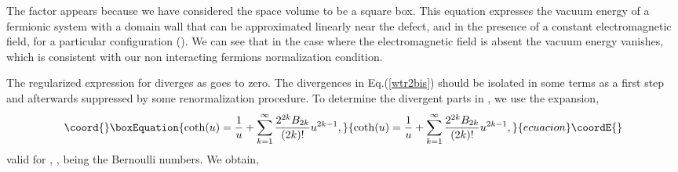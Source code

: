 \documentclass[a4paper,12pt]{article}
\providecommand{\Fd}{\widetilde{F}}
\providecommand{\n}{\eta}
\begin{document}
The \coordHE{} factor appears because we have considered the space volume
to be a square box. This equation expresses the vacuum energy of a
fermionic system with a domain wall that can be approximated linearly
near the defect, and in the presence of a constant electromagnetic
field, for a particular configuration (\myHighlight{$\Fd \cdot \n=0$}\coordHE{}). We can see that
in the case where the electromagnetic field is absent the vacuum
energy vanishes, which is consistent with our non interacting fermions
normalization condition.

The regularized expression for \coordHE{} diverges as \myHighlight{$\epsilon$}\coordHE{} goes to zero.  The
divergences in Eq.(\ref{wtr2bis}) should be isolated in some terms as
a first step and afterwards suppressed by some renormalization
procedure. To determine the divergent parts in \myHighlight{$\epsilon$}\coordHE{}, we use the
expansion,
\begin{equation}\coord{}\boxEquation{
\coth(u)=\frac{1}{u}+\sum_{k=1}^{\infty}\frac{2^{2k}B_{2k}}{(2k)!}u^{2k-1}, 
\label{coth1}
}{
\coth(u)=\frac{1}{u}+\sum_{k=1}^{\infty}\frac{2^{2k}B_{2k}}{(2k)!}u^{2k-1}, 
}{ecuacion}\coordE{}\end{equation}
valid for \coordHE{}, \coordHE{}, being the Bernoulli numbers.  We
obtain,
\end{document}
